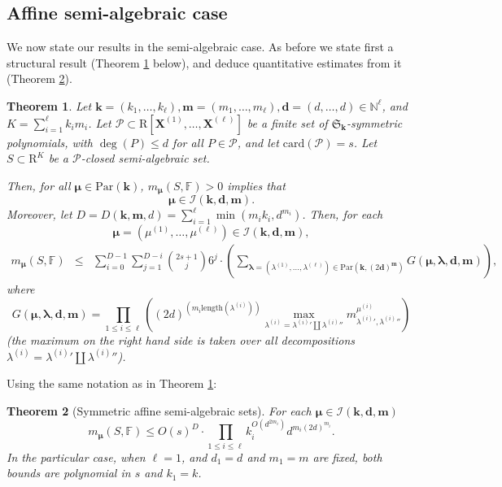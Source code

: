 \documentclass{amsart}
\newtheorem{theorem}{Theorem}
\theoremstyle{definition}
\theoremstyle{remark}
\numberwithin{equation}{section}
\begin{document}
\subsection{Affine semi-algebraic case}
We now state our results in the semi-algebraic case. As before we state first a structural result
(Theorem \ref{thm:main-product-of-symmetric-sa} below), and deduce quantitative estimates
from it (Theorem \ref{thm:main-product-of-symmetric-sa-quantitative}). 
\begin{theorem}
\label{thm:main-product-of-symmetric-sa}
Let ${\mathbf{k}}=(k_1,\ldots,k_\ell),
{\mathbf{m}} =(m_1,\ldots,m_\ell), 
{\mathbf{d}}=(d,\ldots,d) \in {\mathbb{N}}^\ell$, and $K = \sum_{i=1}^{\ell} k_i m_i$.
Let 
$\mathcal{P} \subset {\mathrm{R}}[{\mathbf{X}}^{(1)},\ldots,{\mathbf{X}}^{(\ell)}]$
be a finite set of $\mathfrak{S}_{\mathbf{k}}$-symmetric polynomials, 
with $\deg(P) \leq d$ for all  $P \in \mathcal{P}$, and let ${\mathrm{card}}(\mathcal{P}) = s$. Let  
$S \subset {\mathrm{R}}^K$  be a $\mathcal{P}$-closed semi-algebraic set.

Then, for all $\pmb{\mu} \in {\mathrm{Par}}({\mathbf{k}})$,  $m_{\pmb{\mu}}(S,{\mathbb{F}}) > 0$ implies that
\[
\pmb{\mu} \in 
\mathcal{I}({\mathbf{k}},{\mathbf{d}},{\mathbf{m}}).
\]
Moreover, 
let $D=D (\mathbf{k},\mathbf{m},d) = \sum_{i=1}^{\ell} \min
  (m_i k_i ,d^{m_i})$.
Then,
for each  
\[
\pmb{\mu} = (\mu^{(1)},\ldots,\mu^{(\ell)}) \in \mathcal{I}({\mathbf{k}},{\mathbf{d}},{\mathbf{m}}),
\]  
\begin{eqnarray*}
  m_{\pmb{\mu}}(S,{\mathbb{F}})  &\leq& 
    \sum_{i=0}^{D-1}
    \sum_{j=1}^{D-i} \binom{2 s+1}{j} 6^{j} \cdot \left(\sum_{\pmb{\lambda}=(\lambda^{(1)},\ldots,\lambda^{(\ell)})\in {\mathrm{Par}}({\mathbf{k}}, (2{\mathbf{d}})^{\mathbf{m}})}
G(\pmb{\mu},\pmb{\lambda},{\mathbf{d}},{\mathbf{m}})\right),
\end{eqnarray*}
where 
\[
G(\pmb{\mu},\pmb{\lambda},{\mathbf{d}},{\mathbf{m}}) =
\prod_{1 \leq i \leq \ell}
 \left(
 (2 d)^{(m_i{\mathrm{length}}(\lambda^{(i)}))}
 \max_{\lambda^{(i)} = {\lambda^{(i)}}' \coprod {\lambda^{(i)}}''}
 m^{\mu^{(i)}}_{{\lambda^{(i)}}',{\lambda^{(i)}}''}
 \right)
 \]
(the maximum on the right hand side is taken over all decompositions
$\lambda^{(i)} = {\lambda^{(i)}}' \coprod {\lambda^{(i)}}''$). 
\end{theorem}

Using the same notation as in Theorem \ref{thm:main-product-of-symmetric-sa}:
\begin{theorem}[Symmetric affine semi-algebraic sets]
\label{thm:main-product-of-symmetric-sa-quantitative}
For each  $\pmb{\mu} \in \mathcal{I}({\mathbf{k}},{\mathbf{d}},{\mathbf{m}})$
\[
m_{\pmb{\mu}}(S,{\mathbb{F}}) \leq
O(s)^{D} \cdot \prod_{1 \leq i \leq \ell} k_i^{O(d^{2 m_i})} d^{m_i(2d)^{m_i}}.
\]
In the particular case, when $\ell=1$, and $d_1=d$ and $m_1=m$  are fixed, both bounds are polynomial in $s$ and
$k_1=k$.
\end{theorem}
\end{document}
